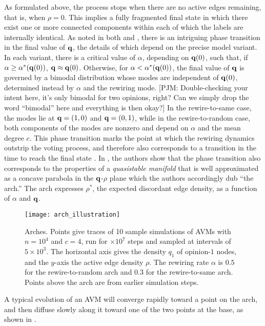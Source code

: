 \documentclass[review, onefignum, onetabnum]{siamart171218}
\newcommand{\pjm}[1]{{\color{blue}[PJM: #1]}}
\begin{document}
	As formulated above, the process stops when there are no active edges remaining, that is, when $\rho = 0$. This implies a fully fragmented final state in which there exist one or more connected components within each of which the labels are internally identical. 
	As noted in both \cite{Holme2006} and \cite{Durrett2012}, there is an intriguing phase transition in the final value of $\mathbf{q}$, the details of which depend on the precise model variant. 
	In each variant, there is a critical value of $\alpha$, depending on $\mathbf{q}(0)$, such that, if $\alpha \geq \alpha^*(\mathbf{q}(0))$, $\mathbf{q} \approx \mathbf{q}(0)$. 
	Otherwise, for $\alpha < \alpha^*(\mathbf{q}(0))$, the final value of $\mathbf{q}$ is governed by a bimodal distribution whose modes are independent of $\mathbf{q}(0)$, determined instead by $\alpha$ and the rewiring mode. \pjm{Double-checking your intent here, it's only bimodal for two opinions, right? Can we simply drop the word ``bimodal'' here and everything is then okay?}
	In the rewire-to-same case, the modes lie at $\mathbf{q} = (1,0)$ and $\mathbf{q} = (0,1)$, while in the rewire-to-random case, both components of the modes are nonzero and depend on $\alpha$ and the mean degree $c$. 
	This phase transition marks the point at which the rewiring dynamics outstrip the voting process, and therefore also corresponds to a transition in the time to reach the final state \cite{Holme2006,Rogers2013}. 
	In \cite{Durrett2012}, the authors show that the phase transition also corresponds to the properties of a \emph{quasistable manifold} that is well approximated as a concave parabola in the $\mathbf{q}$-$\rho$ plane which the authors accordingly dub ``the arch.'' 
	The arch expresses $\rho^*$, the expected discordant edge density, as a function of $\alpha$ and $\mathbf{q}$. 
	\begin{figure}
	 	\centering
	 	\texttt{[image: arch\_illustration]}
	 	\caption{Arches. 
	 	Points give traces of 10 sample simulations of AVMs with $n = 10^4$ and $c = 4$, run for $\times 10^7$ steps and sampled at intervals of $5\times 10^3$. 
	 	The horizontal axis gives the density $q_1$ of opinion-$1$ nodes, and the $y$-axis the active edge density $\rho$. 
	 	The rewiring rate $\alpha$ is $0.5$ for the rewire-to-random arch and $0.3$ for the rewire-to-same arch.
	 	Points above the arch are from earlier simulation steps.} \label{fig:arch_illustration}
	\end{figure} 
	A typical evolution of an AVM will converge rapidly toward a point on the arch, and then diffuse slowly along it toward one of the two points at the base, as shown in .
\end{document}
